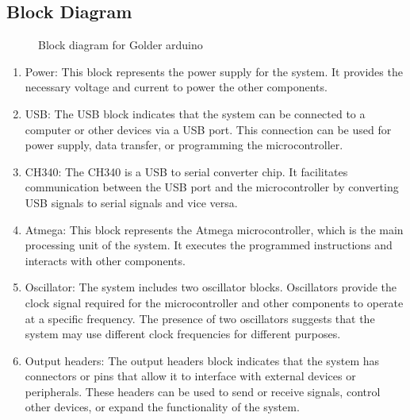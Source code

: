 \documentclass[a4paper,11pt]{article}%
\begin{document}
\subsection{Block Diagram}

\begin{figure}[H]
	\centering
	\caption{Block diagram for Golder arduino}
\end{figure}

\begin{enumerate}
	\item Power: This block represents the power supply for the system. It provides the necessary voltage and current to power the other components.
	\item USB: The USB block indicates that the system can be connected to a computer or other devices via a USB port. This connection can be used for power supply, data transfer, or programming the microcontroller.
	\item CH340: The CH340 is a USB to serial converter chip. It facilitates communication between the USB port and the microcontroller by converting USB signals to serial signals and vice versa.
	\item Atmega: This block represents the Atmega microcontroller, which is the main processing unit of the system. It executes the programmed instructions and interacts with other components.
	\item Oscillator: The system includes two oscillator blocks. Oscillators provide the clock signal required for the microcontroller and other components to operate at a specific frequency. The presence of two oscillators suggests that the system may use different clock frequencies for different purposes.
	\item Output headers: The output headers block indicates that the system has connectors or pins that allow it to interface with external devices or peripherals. These headers can be used to send or receive signals, control other devices, or expand the functionality of the system.
\end{enumerate}
\end{document}
